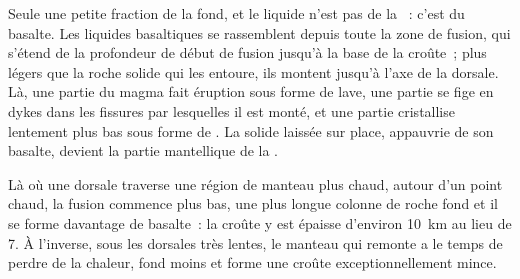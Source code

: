 Seule une petite fraction de la  fond, et le liquide n'est pas de
la ~: c'est du basalte. Les liquides basaltiques se rassemblent
depuis toute la zone de fusion, qui s'étend de la profondeur de début de
fusion jusqu'à la base de la croûte~; plus légers que la roche solide qui
les entoure, ils montent jusqu'à l'axe de la dorsale. Là, une partie du
magma fait éruption sous forme de lave, une partie se fige en dykes dans les
fissures par lesquelles il est monté, et une partie cristallise lentement
plus bas sous forme de . La  solide laissée sur place,
appauvrie de son basalte, devient la partie mantellique de la .

Là où une dorsale traverse une région de manteau plus chaud, autour d'un
point chaud, la fusion commence plus bas, une plus longue colonne de roche
fond et il se forme davantage de basalte~: la croûte y est épaisse
d'environ \qty{10}{km} au lieu de 7. À l'inverse, sous les dorsales très
lentes, le manteau qui remonte a le temps de perdre de la chaleur, fond
moins et forme une croûte exceptionnellement mince.

